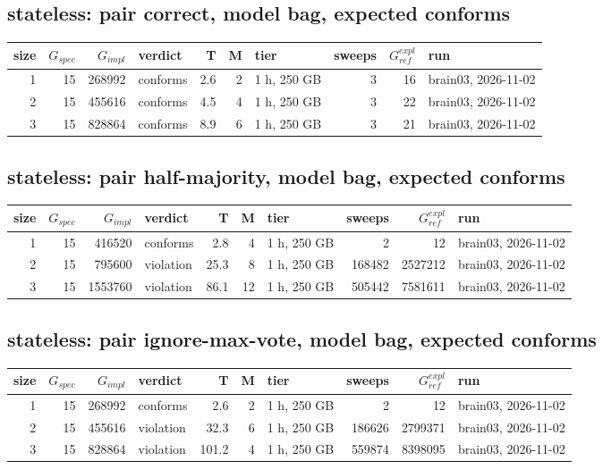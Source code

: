 \documentclass[10pt]{article}
\begin{document}
\subsection*{stateless: pair \textsf{correct}, model bag, expected conforms}
\begin{longtable}{@{}rrrlrrlrrl@{}}
\toprule
size & $G_{\mathit{spec}}$ & $G_{\mathit{impl}}$ & verdict & T & M & tier & sweeps & $G_{\mathit{ref}}^{\mathit{expl}}$ & run \\
\midrule
\endhead
\color{blue} 1 & 15 & 268992 & conforms & 2.6 & 2 & 1 h, 250 GB & 3 & 16 & brain03, 2026-11-02 \\
\color{blue} 2 & 15 & 455616 & conforms & 4.5 & 4 & 1 h, 250 GB & 3 & 22 & brain03, 2026-11-02 \\
\color{blue} 3 & 15 & 828864 & conforms & 8.9 & 6 & 1 h, 250 GB & 3 & 21 & brain03, 2026-11-02 \\
\bottomrule
\end{longtable}
\subsection*{stateless: pair \textsf{half-majority}, model bag, expected conforms}
\begin{longtable}{@{}rrrlrrlrrl@{}}
\toprule
size & $G_{\mathit{spec}}$ & $G_{\mathit{impl}}$ & verdict & T & M & tier & sweeps & $G_{\mathit{ref}}^{\mathit{expl}}$ & run \\
\midrule
\endhead
\color{blue} 1 & 15 & 416520 & conforms & 2.8 & 4 & 1 h, 250 GB & 2 & 12 & brain03, 2026-11-02 \\
\color{blue} 2 & 15 & 795600 & violation & 25.3 & 8 & 1 h, 250 GB & 168482 & 2527212 & brain03, 2026-11-02 \\
\color{blue} 3 & 15 & 1553760 & violation & 86.1 & 12 & 1 h, 250 GB & 505442 & 7581611 & brain03, 2026-11-02 \\
\bottomrule
\end{longtable}
\subsection*{stateless: pair \textsf{ignore-max-vote}, model bag, expected conforms}
\begin{longtable}{@{}rrrlrrlrrl@{}}
\toprule
size & $G_{\mathit{spec}}$ & $G_{\mathit{impl}}$ & verdict & T & M & tier & sweeps & $G_{\mathit{ref}}^{\mathit{expl}}$ & run \\
\midrule
\endhead
\color{blue} 1 & 15 & 268992 & conforms & 2.6 & 2 & 1 h, 250 GB & 2 & 12 & brain03, 2026-11-02 \\
\color{blue} 2 & 15 & 455616 & violation & 32.3 & 6 & 1 h, 250 GB & 186626 & 2799371 & brain03, 2026-11-02 \\
\color{blue} 3 & 15 & 828864 & violation & 101.2 & 4 & 1 h, 250 GB & 559874 & 8398095 & brain03, 2026-11-02 \\
\bottomrule
\end{longtable}
\end{document}

